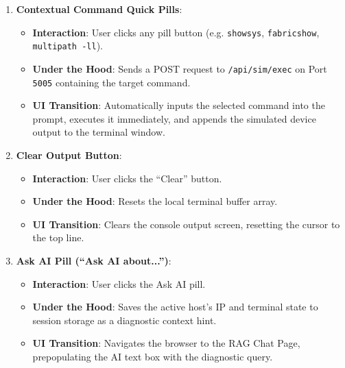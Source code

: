 \documentclass[11pt,a4paper]{article}
\begin{document}
\begin{enumerate}
    \item \textbf{Contextual Command Quick Pills}:
    \begin{itemize}
        \item \textbf{Interaction}: User clicks any pill button (e.g. \texttt{showsys}, \texttt{fabricshow}, \texttt{multipath -ll}).
        \item \textbf{Under the Hood}: Sends a POST request to \texttt{/api/sim/exec} on Port \texttt{5005} containing the target command.
        \item \textbf{UI Transition}: Automatically inputs the selected command into the prompt, executes it immediately, and appends the simulated device output to the terminal window.
    \end{itemize}
    
    \item \textbf{Clear Output Button}:
    \begin{itemize}
        \item \textbf{Interaction}: User clicks the ``Clear'' button.
        \item \textbf{Under the Hood}: Resets the local terminal buffer array.
        \item \textbf{UI Transition}: Clears the console output screen, resetting the cursor to the top line.
    \end{itemize}
    
    \item \textbf{Ask AI Pill (``Ask AI about...'')}:
    \begin{itemize}
        \item \textbf{Interaction}: User clicks the Ask AI pill.
        \item \textbf{Under the Hood}: Saves the active host's IP and terminal state to session storage as a diagnostic context hint.
        \item \textbf{UI Transition}: Navigates the browser to the RAG Chat Page, prepopulating the AI text box with the diagnostic query.
    \end{itemize}
\end{enumerate}
\end{document}
